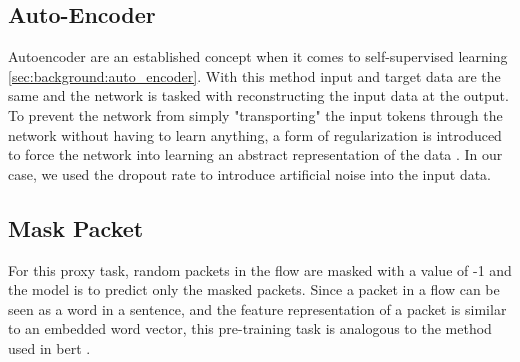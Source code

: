 \subsection{Auto-Encoder} \label{sec:experiments:transformer:auto_encoder}

Autoencoder are an established concept when it comes to self-supervised learning \ref{sec:background:auto_encoder}. With this method input and target data are the same and the network is tasked with reconstructing the input data at the output. To prevent the network from simply "transporting" the input tokens through the network without having to learn anything, a form of regularization is introduced to force the network into learning an abstract representation of the data \cite{autoencoders}. 
In our case, we used the dropout rate to introduce artificial noise into the input data.

\subsection{Mask Packet} \label{sec:experiments:transformer:mask_packet}

For this proxy task, random packets in the flow are masked with a value of -1 and the model is to predict only the masked packets. Since a packet in a flow can be seen as a word in a sentence, and the feature representation of a packet is similar to an embedded word vector, this pre-training task is analogous to the method used in \gls{bert} \cite{bert}. 

\newpage
